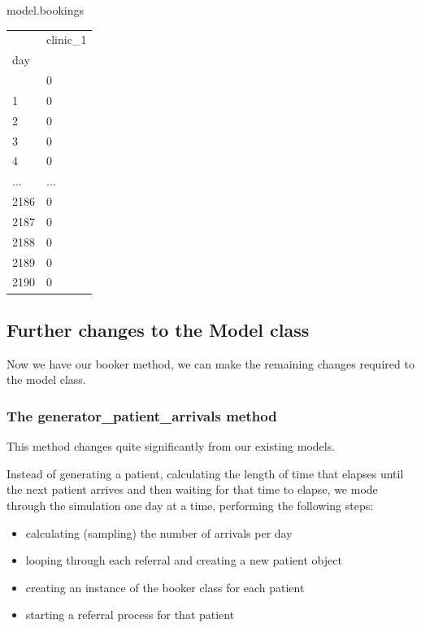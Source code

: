 \documentclass[
  letterpaper,
  DIV=11,
  numbers=noendperiod]{scrreprt}
\newenvironment{Shaded}{\begin{snugshade}}{\end{snugshade}}
\newcommand{\NormalTok}[1]{\textcolor[rgb]{0.00,0.23,0.31}{#1}}
\providecommand{\tightlist}{%
  \setlength{\itemsep}{0pt}\setlength{\parskip}{0pt}}\usepackage{longtable,booktabs,array}
\begin{document}
\begin{Shaded}
\begin{Highlighting}[]
\NormalTok{model.bookings}
\end{Highlighting}
\end{Shaded}

\begin{longtable}[]{@{}ll@{}}
\toprule\noalign{}
& clinic\_1 \\
day & \\
\midrule\noalign{}
\endhead
\bottomrule\noalign{}
\endlastfoot
0 & 0 \\
1 & 0 \\
2 & 0 \\
3 & 0 \\
4 & 0 \\
... & ... \\
2186 & 0 \\
2187 & 0 \\
2188 & 0 \\
2189 & 0 \\
2190 & 0 \\
\end{longtable}

\subsection{Further changes to the Model
class}\label{further-changes-to-the-model-class}

Now we have our booker method, we can make the remaining changes
required to the model class.

\subsubsection{The generator\_patient\_arrivals
method}\label{the-generator_patient_arrivals-method-3}

This method changes quite significantly from our existing models.

Instead of generating a patient, calculating the length of time that
elapses until the next patient arrives and then waiting for that time to
elapse, we mode through the simulation one day at a time, performing the
following steps:

\begin{itemize}
\tightlist
\item
  calculating (sampling) the number of arrivals per day
\item
  looping through each referral and creating a new patient object
\item
  creating an instance of the booker class for each patient
\item
  starting a referral process for that patient
\end{itemize}
\end{document}

